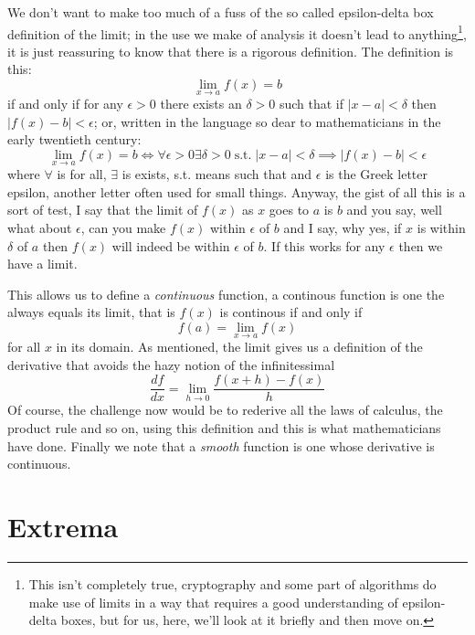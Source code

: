 \documentclass[12pt]{article}
\begin{document}
We don't want to make too much of a fuss of the so called
epsilon-delta box definition of the limit; in the use we make of
analysis it doesn't lead to anything\footnote{This isn't completely true, cryptography and some part of algorithms do make use of limits in a way that requires a good understanding of epsilon-delta boxes, but for us, here, we'll look at it briefly and then move on.}, it is just reassuring to know that there is a rigorous definition. The definition is this:
\begin{equation}
  \lim_{x\rightarrow a}f(x)=b
\end{equation}
if and only if for any $\epsilon>0$ there exists an $\delta>0$ such
that if $|x-a|<\delta$ then $|f(x)-b|<\epsilon$; or, written in the
language so dear to mathematicians in the early twentieth century:
\begin{equation}
  \lim_{x\rightarrow a}f(x)=b\iff\forall\epsilon>0\exists\delta>0\;\mbox{s.t.}\;|x-a|<\delta\implies|f(x)-b|<\epsilon
\end{equation}
where $\forall$ is for all, $\exists$ is exists, s.t. means such that
and $\epsilon$ is the Greek letter epsilon, another letter often used
for small things. Anyway, the gist of all this is a sort of test, I
say that the limit of $f(x)$ as $x$ goes to $a$ is $b$ and you say,
well what about $\epsilon$, can you make $f(x)$ within $\epsilon$ of
$b$ and I say, why yes, if $x$ is within $\delta$ of $a$ then $f(x)$
will indeed be within $\epsilon$ of $b$. If this works for any
$\epsilon$ then we have a limit.

This allows us to define a \textsl{continuous} function, a continous
function is one the always equals its limit, that is $f(x)$ is continous if and only if
\begin{equation}
  f(a)=\lim_{x\rightarrow a}f(x)
\end{equation}
for all $x$ in its domain. As mentioned, the limit gives us a definition of the derivative that avoids the hazy notion of the infinitessimal
\begin{equation}
  \frac{df}{dx}=\lim_{h\rightarrow 0}\frac{f(x+h)-f(x)}{h}
\end{equation}
Of course, the challenge now would be to rederive all the laws of
calculus, the product rule and so on, using this definition and this
is what mathematicians have done. Finally we note that a
\textsl{smooth} function is one whose derivative is continuous.

\section*{Extrema}
\end{document}
